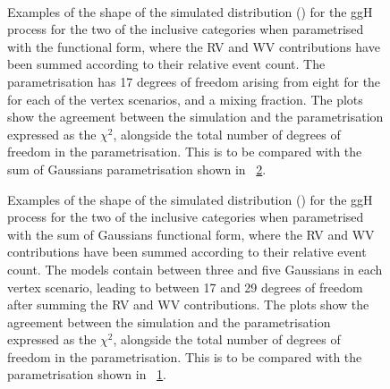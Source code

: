 \begin{figure}[htp!]
\centering
 \\
\caption{Examples of the shape of the simulated \mgg distribution (\GeV) for the ggH process for the two of the inclusive categories when parametrised with the \DCBpG functional form, where the RV and WV contributions have been summed according to their relative event count. The parametrisation has 17 degrees of freedom arising from eight for the \DCBpG for each of the vertex scenarios, and a mixing fraction. The plots show the agreement between the simulation and the parametrisation expressed as the $\chi^2$, alongside the total number of degrees of freedom in the parametrisation. This is to be compared with the sum of Gaussians parametrisation shown in \Fig~\ref{fig:model:functionalform_bis}.}

\label{fig:model:functionalform}
\end{figure}
\begin{figure}[htp!]
\centering
\caption{Examples of the shape of the simulated \mgg distribution (\GeV) for the ggH process for the two of the inclusive categories when parametrised with the sum of Gaussians functional form, where the RV and WV contributions have been summed according to their relative event count. The models contain between three and five Gaussians in each vertex scenario, leading to between 17 and 29 degrees of freedom after summing the RV and WV contributions. The plots show the agreement between the simulation and the parametrisation expressed as the $\chi^2$, alongside the total number of degrees of freedom in the parametrisation. This is to be compared with the \DCBpG parametrisation shown in \Fig~\ref{fig:model:functionalform}.}

\label{fig:model:functionalform_bis}
\end{figure}
